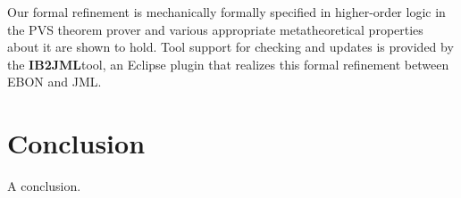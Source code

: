 \documentclass{article}
\newcommand{\name}{\textbf{IB2JML}}
\begin{document}
Our formal refinement is mechanically formally specified in
higher-order logic in the PVS theorem prover and various appropriate
metatheoretical properties about it are shown to hold.  Tool support
for checking and updates is provided by the \name tool, an Eclipse
plugin that realizes this formal refinement between EBON and JML.

\section{Conclusion}

A conclusion.




\end{document}
